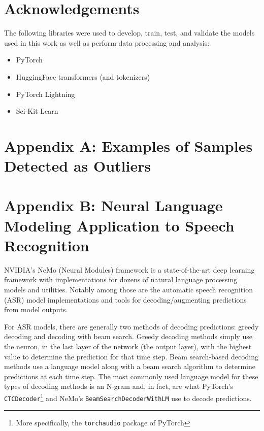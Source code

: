 \documentclass[12pt]{article}
\begin{document}
\newpage
\section{Acknowledgements}
The following libraries were used to develop, train, test, and validate the models used in this work as well as perform data processing and analysis:
\begin{itemize}
    \item PyTorch \cite{paszke_pytorch_2019}
    \item HuggingFace transformers (and tokenizers) \cite{wolf_transformers_2020}
    \item PyTorch Lightning \cite{falcon_pytorchlightning_2019}
    \item Sci-Kit Learn \cite{pedregosa_scikit-learn_2011}
\end{itemize}

\newpage
\section{Appendix A: Examples of Samples Detected as Outliers}


\newpage
\section{Appendix B: Neural Language Modeling Application to Speech Recognition}\label{sec:appendix_a}
NVIDIA's NeMo (Neural Modules) framework \cite{kuchaiev_nemo_2019} is a state-of-the-art deep learning framework with implementations for dozens of
natural language processing models and utilities. Notably among those are the automatic speech recognition (ASR) model implementations and tools for
decoding/augmenting predictions from model outputs.

For ASR models, there are generally two methods of decoding predictions: greedy decoding and decoding with beam search. Greedy decoding methods simply
use the neuron, in the last layer of the network (the output layer), with the highest value to determine the prediction for that time step. Beam
search-based decoding methods use a language model along with a beam search algorithm to determine predictions at each time step. The most commonly
used language model for these types of decoding methods is an N-gram and, in fact, are what PyTorch's \lstinline|CTCDecoder|\footnote{More
    specifically, the \lstinline|torchaudio| package of PyTorch} \cite{paszke_pytorch_2019} and NeMo's \lstinline|BeamSearchDecoderWithLM|
\cite{kuchaiev_nemo_2019} use to decode predictions.
\end{document}
